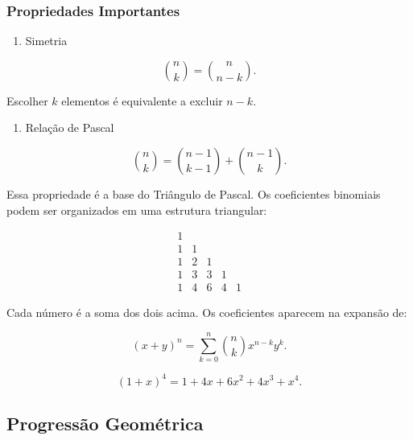 \documentclass[
  letterpaper,
  DIV=11,
  numbers=noendperiod]{scrreprt}
\providecommand{\tightlist}{%
  \setlength{\itemsep}{0pt}\setlength{\parskip}{0pt}}\usepackage{longtable,booktabs,array}
\begin{document}
\subsubsection{Propriedades Importantes}\label{propriedades-importantes}

\begin{enumerate}
\def\labelenumi{\arabic{enumi}.}
\tightlist
\item
  Simetria
\end{enumerate}

\[\binom{n}{k} = \binom{n}{n-k}.\]

Escolher \(k\) elementos é equivalente a excluir \(n-k\).

\begin{enumerate}
\def\labelenumi{\arabic{enumi}.}
\setcounter{enumi}{1}
\tightlist
\item
  Relação de Pascal
\end{enumerate}

\[\binom{n}{k} = \binom{n-1}{k-1} + \binom{n-1}{k}.\]

Essa propriedade é a base do Triângulo de Pascal. Os coeficientes
binomiais podem ser organizados em uma estrutura triangular:

\[\begin{matrix}
1 \\
1 & 1 \\
1 & 2 & 1 \\
1 & 3 & 3 & 1 \\
1 & 4 & 6 & 4 & 1
\end{matrix}\]

Cada número é a soma dos dois acima. Os coeficientes aparecem na
expansão de:

\[(x + y)^n = \sum_{k=0}^{n} \binom{n}{k} x^{n-k} y^k.\]

\begin{tcolorbox}[enhanced jigsaw, colback=white, leftrule=.75mm, colbacktitle=quarto-callout-important-color!10!white, breakable, titlerule=0mm, bottomtitle=1mm, title=\textcolor{quarto-callout-important-color}{\faExclamation}\hspace{0.5em}{Exemplo}, colframe=quarto-callout-important-color-frame, toprule=.15mm, opacityback=0, bottomrule=.15mm, opacitybacktitle=0.6, arc=.35mm, toptitle=1mm, rightrule=.15mm, coltitle=black, left=2mm]

\[(1 + x)^4 = 1 + 4x + 6x^2 + 4x^3 + x^4.\]

\end{tcolorbox}

\subsection{Progressão Geométrica}\label{progressuxe3o-geomuxe9trica}
\end{document}
